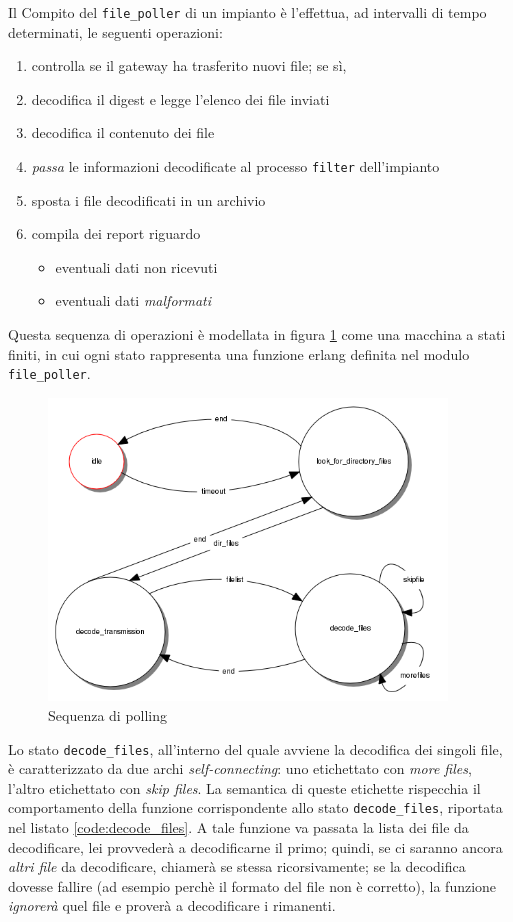 %
Il Compito del \texttt{file\_poller} di un impianto \`e l'effettua, ad intervalli di tempo
determinati, le seguenti operazioni:
%
\begin{enumerate}
\item controlla se il gateway ha trasferito nuovi file; se s\`i,
\item decodifica il digest e legge l'elenco dei file inviati
\item decodifica il contenuto dei file
\item \emph{passa} le informazioni decodificate al processo \texttt{filter} dell'impianto
\item sposta i file decodificati in un archivio
\item compila dei report riguardo
      \begin{itemize}
      \item eventuali dati non ricevuti
      \item eventuali dati \emph{malformati}
      \end{itemize}
\end{enumerate}
%
Questa sequenza di operazioni \`e modellata in figura \ref{fig:polling-sequence} come una
macchina a stati finiti, in cui ogni stato rappresenta una funzione erlang definita nel 
modulo \texttt{file\_poller}.
%
\begin{figure}[!h]
\centering
\includegraphics[width=300pt]{img/file-poller.png}
\caption{Sequenza di polling}
\label{fig:polling-sequence}
\end{figure}
%

%
Lo stato \texttt{decode\_files}, all'interno del quale avviene la decodifica dei singoli file,
\`e caratterizzato da due archi \emph{self-connecting}: uno etichettato con \emph{more files}, 
l'altro etichettato con \emph{skip files}.
%
La semantica di queste etichette rispecchia il comportamento della funzione corrispondente 
allo stato \texttt{decode\_files}, riportata nel listato \ref{code:decode_files}. A tale funzione 
va passata la lista dei file da decodificare, lei provveder\`a a decodificarne il primo; quindi, 
se ci saranno ancora \emph{altri file} da decodificare, chiamer\`a se stessa ricorsivamente; 
se la decodifica dovesse fallire (ad esempio perch\`e il formato del file non \`e corretto), 
la funzione \emph{ignorer\`a} quel file e prover\`a a decodificare i rimanenti.
%

